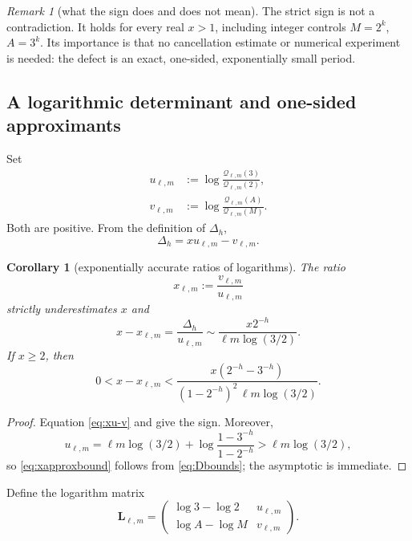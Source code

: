 \documentclass[11pt]{article}
\numberwithin{equation}{section}
\newtheorem{corollary}[theorem]{Corollary}
\theoremstyle{definition}
\theoremstyle{remark}
\newtheorem{remark}[theorem]{Remark}
\begin{document}
\begin{remark}[what the sign does and does not mean]
The strict sign is not a contradiction.  It holds for every real $x>1$, including integer controls $M=2^k$, $A=3^k$.  Its importance is that no cancellation estimate or numerical experiment is needed: the defect is an exact, one-sided, exponentially small period.
\end{remark}

\subsection{A logarithmic determinant and one-sided approximants}

Set
\begin{align}
  u_{\ell,m}
  &:=\log\frac{\mathcal Q_{\ell,m}(3)}{\mathcal Q_{\ell,m}(2)},\label{eq:u}\\
  v_{\ell,m}
  &:=\log\frac{\mathcal Q_{\ell,m}(A)}{\mathcal Q_{\ell,m}(M)}.\label{eq:v}
\end{align}
Both are positive.  From the definition of $\Delta_h$,
\begin{equation}\label{eq:xu-v}
  \Delta_h=xu_{\ell,m}-v_{\ell,m}.
\end{equation}

\begin{corollary}[exponentially accurate ratios of logarithms]\label{cor:logratio}
The ratio
\begin{equation}\label{eq:xapprox}
  x_{\ell,m}:=\frac{v_{\ell,m}}{u_{\ell,m}}
\end{equation}
strictly underestimates $x$ and
\begin{equation}\label{eq:xapproxerror}
  x-x_{\ell,m}=\frac{\Delta_h}{u_{\ell,m}}
  \sim \frac{x2^{-h}}{\ell m\log(3/2)}.
\end{equation}
If $x\ge2$, then
\begin{equation}\label{eq:xapproxbound}
  0<x-x_{\ell,m}
  <\frac{x(2^{-h}-3^{-h})}
  {(1-2^{-h})^2\,\ell m\log(3/2)}.
\end{equation}
\end{corollary}

\begin{proof}
Equation \eqref{eq:xu-v} and  give the sign.  Moreover,
\[
  u_{\ell,m}=\ell m\log(3/2)
  +\log\frac{1-3^{-h}}{1-2^{-h}}
  >\ell m\log(3/2),
\]
so \eqref{eq:xapproxbound} follows from \eqref{eq:Dbounds}; the asymptotic is immediate.
\end{proof}

Define the logarithm matrix
\begin{equation}\label{eq:Lmatrix}
  \mathbf L_{\ell,m}
  =\begin{pmatrix}
    \log3-\log2 & u_{\ell,m}\\
    \log A-\log M & v_{\ell,m}
  \end{pmatrix}.
\end{equation}
\end{document}
